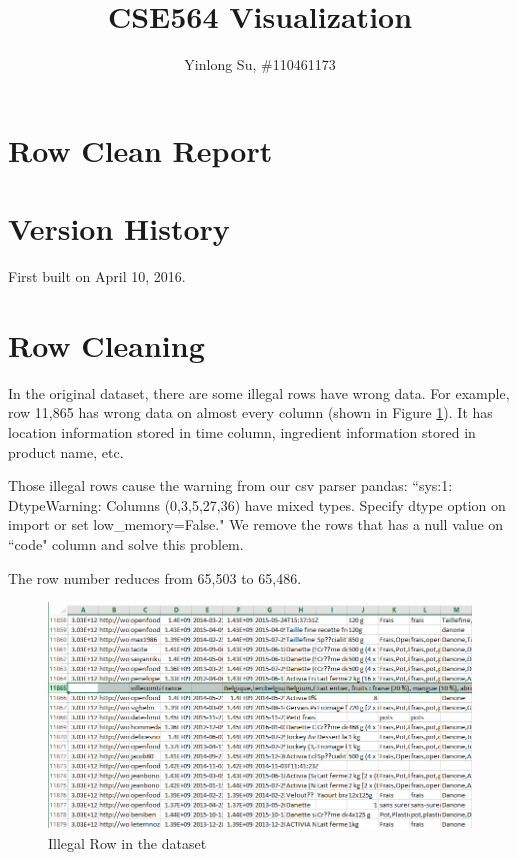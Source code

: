 \documentclass[11pt]{article}
\begin{document}
\title{CSE564 Visualization}
\author{Yinlong Su, \#110461173}
\maketitle

\section*{Row Clean Report}

\setcounter{section}{-1}
\section{Version History}

First built on April 10, 2016.

\section{Row Cleaning}

In the original dataset, there are some illegal rows have wrong data. For example, row 11,865 has wrong data on almost every column (shown in Figure \ref{fig:illegalRow}). It has location information stored in time column, ingredient information stored in product name, etc.
\par
Those illegal rows cause the warning from our csv parser pandas: ``sys:1: DtypeWarning: Columns (0,3,5,27,36) have mixed types. Specify dtype option on import or set low\_memory=False." We remove the rows that has a null value on ``code" column and solve this problem.
\par
The row number reduces from 65,503 to 65,486.

\begin{figure}[!htp]
\centering
\includegraphics[width=1.0\textwidth]{../vis/illegal.row.png}
\caption{Illegal Row in the dataset}
\label{fig:illegalRow}
\end{figure}
\end{document}

